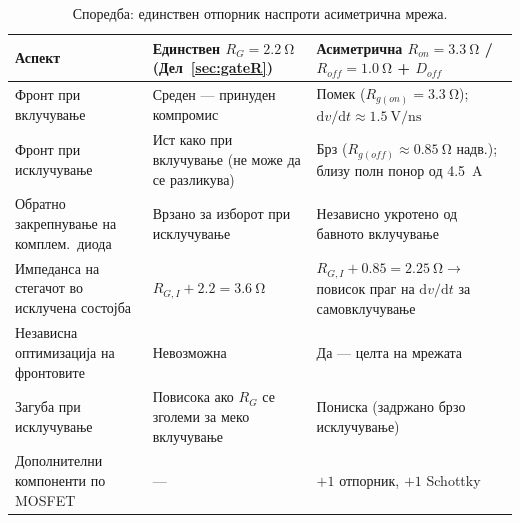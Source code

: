 \documentclass[journal,onecolumn,11pt]{IEEEtran}
\begin{document}
\begin{table}[t]
\centering
\caption{Споредба: единствен отпорник наспроти асиметрична мрежа.}
\label{tab:asym}
\small
\begin{tabularx}{\columnwidth}{@{}L L L@{}}
\toprule
\textbf{Аспект} & \textbf{Единствен $R_{G}=\SI{2.2}{\ohm}$ (Дел~\ref{sec:gateR})} &
\textbf{Асиметрична $R_{on}=\SI{3.3}{\ohm}$ / $R_{off}=\SI{1.0}{\ohm}$ + $D_{off}$} \\
\midrule
Фронт при вклучување & Среден --- принуден компромис & Помек ($R_{g(on)}=\SI{3.3}{\ohm}$);
$\mathrm{d}v/\mathrm{d}t\approx\SI{1.5}{\volt\per\nano\second}$~\cite{ipt015ds,ucc27211} \\
Фронт при исклучување & Ист како при вклучување (не може да се разликува) & Брз
($R_{g(off)}\approx\SI{0.85}{\ohm}$ надв.); близу полн понор од \SI{4.5}{\ampere}~\cite{ucc27211} \\
Обратно закрепнување на комплем.\ диода & Врзано за изборот при исклучување &
Независно укротено од бавното вклучување~\cite{pmeg4030er,nexperia_gdfund} \\
Импеданса на стегачот во исклучена состојба & $R_{G,I}+2.2=\SI{3.6}{\ohm}$ &
$R_{G,I}+0.85=\SI{2.25}{\ohm}\rightarrow$ повисок праг на $\mathrm{d}v/\mathrm{d}t$
за самовклучување~\cite{nexperia_gdfund,toshiba_dvdt} \\
Независна оптимизација на фронтовите & Невозможна & Да --- целта на мрежата~\cite{pmeg4030er} \\
Загуба при исклучување & Повисока ако $R_G$ се зголеми за меко вклучување & Пониска
(задржано брзо исклучување) \\
Дополнителни компоненти по MOSFET & --- & $+1$ отпорник, $+1$ Schottky \\
\bottomrule
\end{tabularx}
\end{table}
\end{document}
